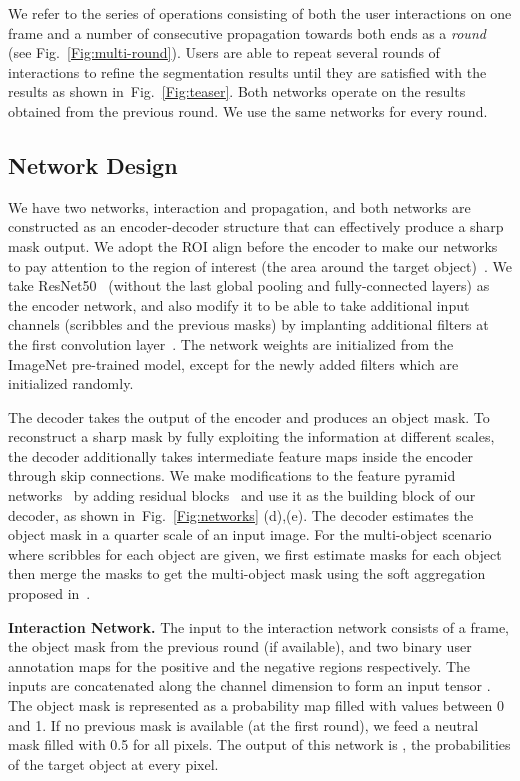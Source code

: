 \documentclass[10pt,twocolumn,letterpaper]{article}
\newcommand{\fref}[1]{Fig.~\ref{#1}}
\renewcommand{\paragraph}[1]{\vspace{1mm}\noindent\textbf{#1}}
\begin{document}
We refer to the series of operations consisting of both the user interactions on one frame and a number of consecutive propagation towards both ends as a \textit{round} (see \fref{Fig:multi-round}). Users are able to repeat several rounds of interactions to refine the segmentation results until they are satisfied with the results as shown in~\fref{Fig:teaser}. Both networks operate on the results obtained from the previous round. We use the same networks for every round. 

\subsection{Network Design}\label{subsec:network}
We have two networks, interaction and propagation, and both networks are constructed as an encoder-decoder structure that can effectively produce a sharp mask output. We adopt the ROI align before the encoder to make our networks to pay attention to the region of interest (the area around the target object)~\cite{he2017mask}.
We take ResNet50~\cite{he2016deep} (without the last global pooling and fully-connected layers) as the encoder network, and also modify it to be able to take additional input channels (\eg scribbles and the previous masks) by implanting additional filters at the first convolution layer~\cite{perazzi2017learning, xu2016deep}.
The network weights are initialized from the ImageNet pre-trained model, except for the newly added filters which are initialized randomly. 

The decoder takes the output of the encoder and produces an object mask. 
To reconstruct a sharp mask by fully exploiting the information at different scales, the decoder additionally takes intermediate feature maps inside the encoder through skip connections. 
We make modifications to the feature pyramid networks~\cite{Lin_2017_CVPR, pinheiro2016learning} by adding residual blocks~\cite{he2016identity} and use it as the building block of our decoder, as shown in~\fref{Fig:networks} (d),(e). 
The decoder estimates the object mask in a quarter scale of an input image.
For the multi-object scenario where scribbles for each object are given, we first estimate masks for each object then merge the masks to get the multi-object mask using the soft aggregation proposed in~\cite{oh2018fast}.


\paragraph{Interaction Network.} 
The input to the interaction network consists of a frame, the object mask from the previous round (if available), and two binary user annotation maps for the positive and the negative regions respectively. 
The inputs are concatenated along the channel dimension to form an input tensor .
The object mask is represented as a probability map filled with values between 0 and 1. 
If no previous mask is available (\eg at the first round), we feed a neutral mask filled with 0.5 for all pixels.
The output of this network is , the probabilities of the target object at every pixel. 
\end{document}

